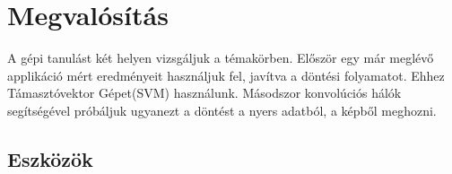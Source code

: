 %
%
%
%
%
%
%
%
%
%




\newpage
\section{Megvalósítás}

A gépi tanulást két helyen vizsgáljuk a témakörben.
Először egy már meglévő applikáció mért eredményeit használjuk fel,
javítva a döntési folyamatot. Ehhez Támasztóvektor Gépet(SVM) használunk.
Másodszor konvolúciós hálók segítségével próbáljuk ugyanezt a döntést 
a nyers adatból, a képből meghozni. 

\subsection{Eszközök}

